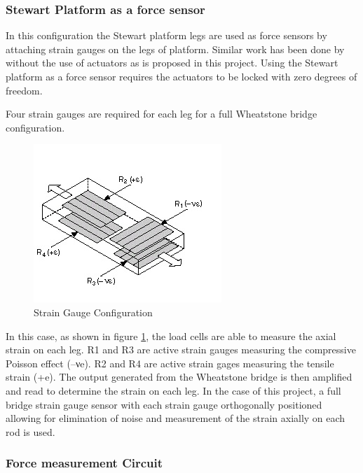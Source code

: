 \subsubsection*{Stewart Platform as a force sensor}
In this configuration the Stewart platform legs are used as force sensors by attaching strain gauges on the legs of platform. Similar work has been done by \cite{ferreira2015design} without the use of actuators as is proposed in this project. Using the Stewart platform as a force sensor requires the actuators to be locked with zero degrees of freedom.

Four strain gauges are required for each leg for a full Wheatstone bridge configuration. 
\begin{center}
	\begin{figure}[H]
		\centering
		\includegraphics{Figures/loadConf}
		\caption[Strain Gauge Configuration]{Strain Gauge Configuration \cite{noauthor_measuring_nodate}}
		\label{strain}
	\end{figure}
\end{center}
In this case, as shown in figure \ref{strain}, the load cells are able to measure the axial strain on each leg. R1 and R3 are active strain gauges measuring the compressive Poisson effect (–νe). R2 and R4 are active strain gages measuring the tensile strain (+e). The output generated from the Wheatstone bridge is then amplified and read to determine the strain on each leg.
In the case of this project, a full bridge strain gauge sensor with each strain gauge orthogonally positioned allowing for elimination of noise and measurement of the strain axially on each rod is used.

\subsubsection*{Force measurement Circuit}

